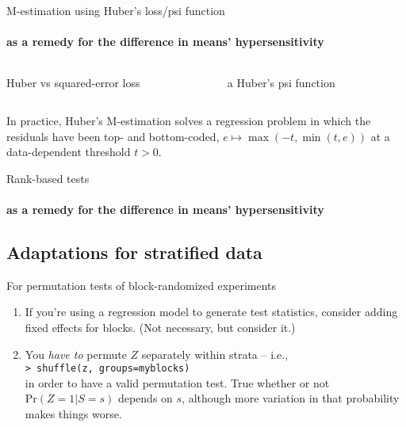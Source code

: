 \begin{frame}{M-estimation using Huber's loss/psi function} \framesubtitle{as a remedy for the difference in means' hypersensitivity}
  \begin{columns}
    \begin{Column}
          \begin{center}
         { Huber vs squared-error loss} 
    \end{center}
    \end{Column}
    \begin{Column}
          \begin{center}a
         { Huber's psi function} 
    \end{center}

    \end{Column}
  \end{columns}
\pause
In practice, Huber's M-estimation solves a regression problem in which
the residuals have been top- and bottom-coded, $e \mapsto \max(-t,
\min(t,e))$ at a data-dependent threshold $t>0$.
\end{frame}
\begin{frame}{Rank-based tests } \framesubtitle{as a remedy for the difference in means' hypersensitivity}
  
\end{frame}
\subsection{Adaptations for stratified data}

\begin{frame}{For permutation tests of block-randomized experiments}
  
  \begin{enumerate}
  \item If you're using a regression model to generate test statistics, consider adding fixed effects for blocks. (Not necessary, but consider it.)
  \item  You \textit{have to} permute $Z$ separately within strata -- i.e.,\\ 
\texttt{> shuffle(z, groups=myblocks)}\\
in order to have a  valid permutation test. True whether or not $\mathrm{Pr}(Z=1|S=s)$ depends on $s$, although more variation in that probability makes things worse.
  \end{enumerate}




\end{frame}

